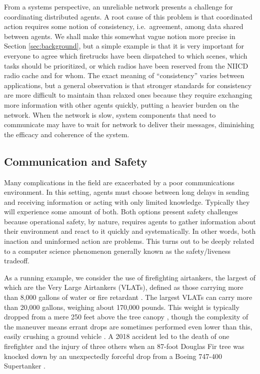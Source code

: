 \documentclass[]             %
{NASA}                       %
\theoremstyle{definition}
\begin{document}
From a systems perspective, an unreliable network presents a challenge
for coordinating distributed agents. A root cause of this problem is
that coordinated action requires some notion of consistency,
i.e.~agreement, among data shared between agents. We shall make this
somewhat vague notion more precise in Section \ref{sec:background},
but a simple example is that it is very important for everyone to
agree which firetrucks have been dispatched to which scenes, which
tasks should be prioritized, or which radios have been reserved from
the {\mbox{NIICD}} radio cache \cite{radiocache} and for whom. The
exact meaning of ``consistency'' varies between applications, but a
general observation is that stronger standards for consistency are
more difficult to maintain than relaxed ones because they require
exchanging more information with other agents quickly, putting a
heavier burden on the network. When the network is slow, system
components that need to communicate may have to wait for network to
deliver their messages, diminishing the efficacy and coherence of the
system.

\subsection{Communication and Safety}
\label{communication-and-safety}

Many complications in the field are exacerbated by a poor
communications environment. In this setting, agents must choose
between long delays in sending and receiving information or acting
with only limited knowledge. Typically they will experience some
amount of both. Both options present safety challenges because
operational safety, by nature, requires agents to gather information
about their environment and react to it quickly and systematically. In
other words, both inaction and uninformed action are problems. This
turns out to be deeply related to a computer science phenomenon
generally known as the safety/liveness tradeoff.

As a running example, we consider the use of firefighting airtankers,
the largest of which are the Very Large Airtankers (VLATs), defined as
those carrying more than 8,000 gallons of water or fire retardant
\cite{2019:airtankerops}. The largest VLATs can carry more than 20,000
gallons, weighing about 170,000 pounds. This weight is typically
dropped from a mere 250 feet above the tree canopy
\cite{2019:airtankerops}, though the complexity of the maneuver means
errant drops are sometimes performed even lower than this, easily
crushing a ground vehicle \cite{2019:stickney}. A 2018 accident led to
the death of one firefighter and the injury of three others when an
87-foot Douglas Fir tree was knocked down by an unexpectedly forceful
drop from a Boeing 747-400 Supertanker \cite{2018:calfire}.
\end{document}
